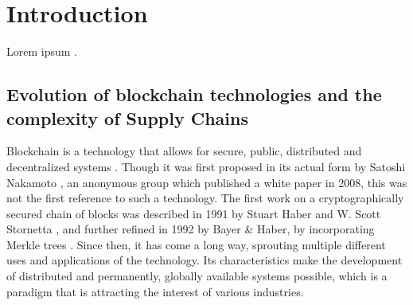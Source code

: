 \chapter{Introduction}
\label{chap:introduction}


Lorem ipsum \cite{ferreira_patterns_2008}.




\section{Evolution of blockchain technologies and the complexity of Supply Chains} \label{sec:context}


Blockchain is a technology that allows for secure, public, distributed and decentralized systems . Though it was first proposed in its actual form by Satoshi Nakamoto \cite{Nakamoto2008}, an anonymous group which published a white paper in 2008, this was not the first reference to such a technology. The first work on a cryptographically secured chain of blocks was described in 1991 by Stuart Haber and W. Scott Stornetta \cite{Haber1991}, and further refined in 1992 by Bayer \& Haber, by incorporating Merkle trees \cite{Bayer1992}. Since then, it has come a long way, sprouting multiple different uses and applications of the technology. Its characteristics make the development of distributed and permanently, globally available systems possible, which is a paradigm that is attracting the interest of various industries.

